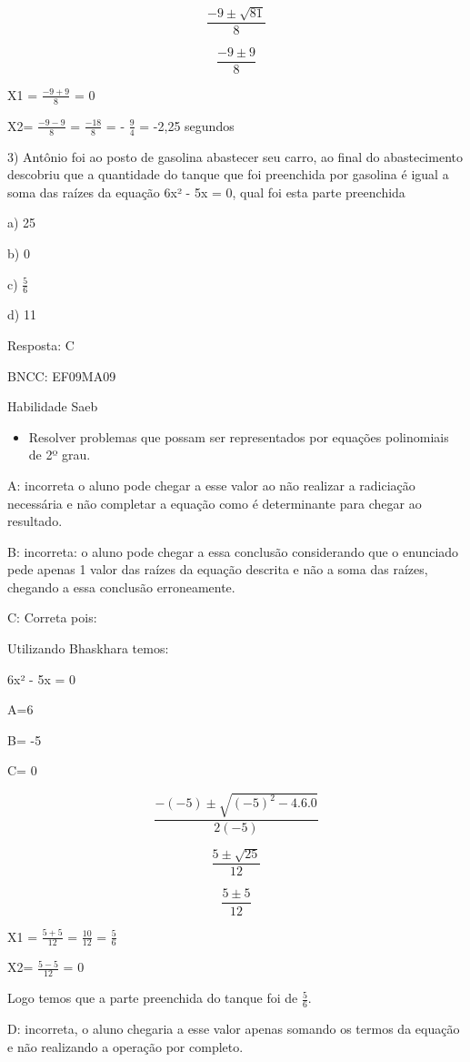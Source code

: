 {\[\frac{- 9 \pm \sqrt{81}}{8}\]

\[\frac{- 9 \pm 9}{8}\]

X1 = \(\frac{- 9 + 9}{8}\) = 0

X2= \(\frac{- 9 - 9}{8}\) = \(\frac{- 18}{8}\) = - \(\frac{9}{4}\) =
-2,25 segundos

3) Antônio foi ao posto de gasolina abastecer seu carro, ao final do
abastecimento descobriu que a quantidade do tanque que foi preenchida
por gasolina é igual a soma das raízes da equação 6x² - 5x = 0, qual foi
esta parte preenchida

a) 25

b) 0

c) \(\frac{5}{6}\)

d) 11

Resposta: C

BNCC: EF09MA09

Habilidade Saeb

\begin{itemize}
\tightlist
\item
  Resolver problemas que possam ser representados por equações
  polinomiais de 2º grau.
\end{itemize}

A: incorreta o aluno pode chegar a esse valor ao não realizar a
radiciação necessária e não completar a equação como é determinante para
chegar ao resultado.

B: incorreta: o aluno pode chegar a essa conclusão considerando que o
enunciado pede apenas 1 valor das raízes da equação descrita e não a
soma das raízes, chegando a essa conclusão erroneamente.

C: Correta pois:

Utilizando Bhaskhara temos:

6x² - 5x = 0

A=6

B= -5

C= 0

\[\frac{- ( - 5) \pm \sqrt{{( - 5)}^{2} - 4.6.0}}{2( - 5)}\]

\[\frac{5 \pm \sqrt{25}}{12}\]

\[\frac{5 \pm 5}{12}\]

X1 = \(\frac{5 + 5}{12}\) = \(\frac{10}{12}\) = \(\frac{5}{6}\)

X2= \(\frac{5 - 5}{12}\) = 0

Logo temos que a parte preenchida do tanque foi de \(\frac{5}{6}\).

D: incorreta, o aluno chegaria a esse valor apenas somando os termos da
equação e não realizando a operação por completo.

}
